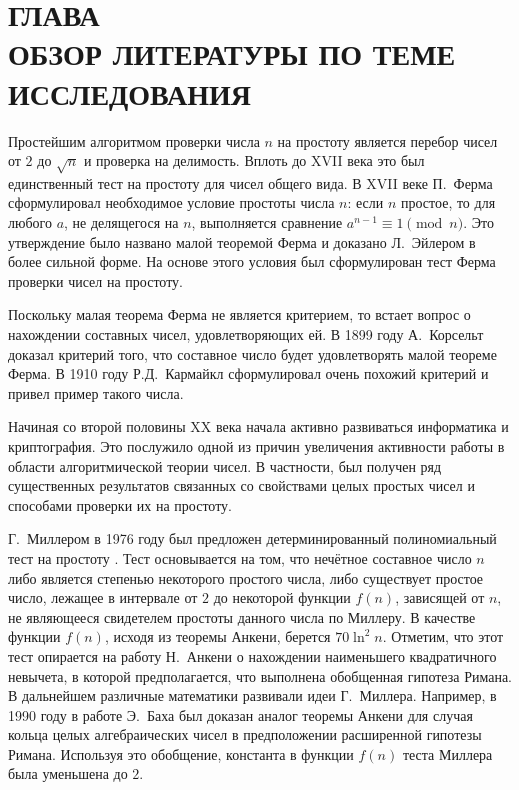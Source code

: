 \documentclass[_00_dissertation.tex]{subfiles}
\begin{document}
\onlyinsubfile{
    \renewcommand{\contentsname}{ОГЛАВЛЕНИЕ}
    \setcounter{tocdepth}{3}
    \tableofcontents
}

\chapter*{\MakeUppercase{Глава \\ Обзор литературы по теме исследования}}\label{chapter:Literature_review}


Простейшим алгоритмом проверки числа $n$ на простоту является перебор чисел от $2$ до $\sqrt{n}$ и проверка на делимость.
Вплоть до XVII века это был единственный тест на простоту для чисел общего вида.
В XVII веке П.~Ферма сформулировал необходимое условие простоты числа $n$: если $n$ простое, то для любого $a$, не делящегося на $n$, выполняется сравнение $a^{n-1} \equiv 1{\pmod{n}}$.
Это утверждение было названо малой теоремой Ферма и доказано Л.~Эйлером в более сильной форме.
На основе этого условия был сформулирован тест Ферма проверки чисел на простоту.

Поскольку малая теорема Ферма не является критерием, то встает вопрос о нахождении составных чисел, удовлетворяющих ей.
В 1899 году А.~Корсельт доказал критерий того, что составное число будет удовлетворять малой теореме Ферма.
В 1910 году Р.Д.~Кармайкл сформулировал очень похожий критерий и привел пример такого числа.

Начиная со второй половины XX века начала активно развиваться информатика и криптография.
Это послужило одной из причин увеличения активности работы в области алгоритмической теории чисел.
В частности, был получен ряд существенных результатов связанных со свойствами целых простых чисел и способами проверки их на простоту.

Г.~Миллером в 1976 году был предложен детерминированный полиномиальный тест на простоту \cite{source:Miller}.
Тест основывается на том, что нечётное составное число $n$ либо является степенью некоторого простого числа, либо существует простое число, лежащее в интервале от $2$ до некоторой функции $f(n)$, зависящей от $n$, не являющееся свидетелем простоты данного числа по Миллеру.
В качестве функции $f(n)$, исходя из теоремы Анкени, берется $70 \ln^2 n$.
Отметим, что этот тест опирается на работу Н.~Анкени о нахождении наименьшего квадратичного невычета, в которой предполагается, что выполнена обобщенная гипотеза Римана.
В дальнейшем различные математики развивали идеи Г.~Миллера.
Например, в 1990 году в работе Э.~Баха \cite{source:Bach} был доказан аналог теоремы Анкени для случая кольца целых алгебраических чисел в предположении расширенной гипотезы Римана.
Используя это обобщение, константа в функции $f(n)$ теста Миллера была уменьшена до $2$.
\end{document}
